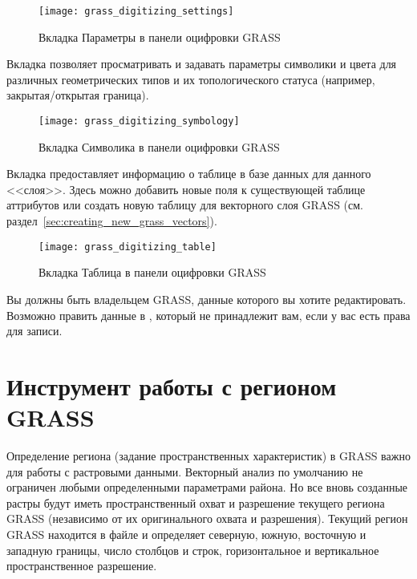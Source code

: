 \begin{figure}[h]
 \centering
 \texttt{[image: grass\_digitizing\_settings]}
 \caption{Вкладка Параметры в панели оцифровки GRASS \wincaption}\label{fig:grass_digitizing_settings}
\end{figure}


Вкладка  позволяет просматривать и задавать параметры
символики и цвета для различных геометрических типов и их
топологического статуса (например, закрытая/открытая граница).

\begin{figure}[h]
 \centering
 \texttt{[image: grass\_digitizing\_symbology]}
 \caption{Вкладка Символика в панели оцифровки GRASS \wincaption}\label{fig:grass_digitizing_symbology}
\end{figure}

 
Вкладка  предоставляет информацию о таблице в базе данных
для данного <<слоя>>. Здесь можно добавить новые поля к существующей
таблице аттрибутов или создать новую таблицу для векторного слоя GRASS
(см. раздел~\ref{sec:creating_new_grass_vectors}).

\begin{figure}[h]
 \centering
 \texttt{[image: grass\_digitizing\_table]}
 \caption{Вкладка Таблица в панели оцифровки GRASS \wincaption}\label{fig:grass_digitizing_table}
 \end{figure}

\begin{Tip}\caption{\textsc{Права редактирования GRASS}}
Вы должны быть владельцем  GRASS, данные которого вы
хотите редактировать. Возможно править данные в ,
который не принадлежит вам, если у вас есть права для записи.
\end{Tip}

\section{Инструмент работы с регионом GRASS}\label{sec:grass_region}

Определение региона (задание пространственных характеристик) в GRASS
важно для работы с растровыми данными. Векторный анализ по умолчанию не
ограничен любыми определенными параметрами района. Но все вновь
созданные растры будут иметь пространственный охват и разрешение
текущего региона GRASS (независимо от их оригинального охвата и
разрешения). Текущий регион GRASS находится в файле
 и определяет северную, южную,
восточную и западную границы, число столбцов и строк, горизонтальное и
вертикальное пространственное разрешение.

